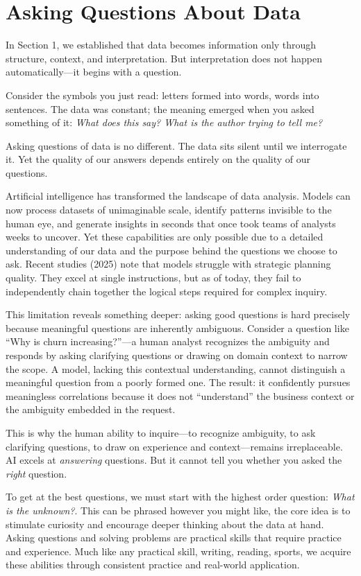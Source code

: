 \section{Asking Questions About Data}

In Section 1, we established that data becomes information only through structure, context, and interpretation. 
But interpretation does not happen automatically---it begins with a question.

Consider the symbols you just read: letters formed into words, words into sentences. 
The data was constant; the meaning emerged when you asked something of it: 
\textit{What does this say? What is the author trying to tell me?}

Asking questions of data is no different. The data sits silent until we interrogate it. 
Yet the quality of our answers depends entirely on the quality of our questions.

Artificial intelligence has transformed the landscape of data analysis. 
Models can now process datasets of unimaginable scale, identify patterns invisible to the human eye, 
and generate insights in seconds that once took teams of analysts weeks to uncover. 
Yet these capabilities are only possible due to a detailed understanding of our data and the purpose behind the questions we choose to ask.
Recent studies (2025) note that models struggle with strategic planning quality. 
They excel at single instructions, but as of today, they fail to independently chain together the logical steps required for complex inquiry. 

This limitation reveals something deeper: asking good questions is hard precisely because meaningful questions are inherently ambiguous. 
Consider a question like ``Why is churn increasing?''---a human analyst recognizes the ambiguity and responds by asking clarifying questions or drawing on domain context to narrow the scope. 
A model, lacking this contextual understanding, cannot distinguish a meaningful question from a poorly formed one. 
The result: it confidently pursues meaningless correlations because it does not ``understand'' the business context or the ambiguity embedded in the request.

This is why the human ability to inquire---to recognize ambiguity, to ask clarifying questions, to draw on experience and context---remains irreplaceable. 
AI excels at \textit{answering} questions. But it cannot tell you whether you asked the \textit{right} question.

To get at the best questions, we must start with the highest order question: \textit{What is the unknown?}. 
This can be phrased however you might like, the core idea is to stimulate curiosity and encourage deeper thinking about the data at hand.
Asking questions and solving problems are practical skills that require practice and experience. 
Much like any practical skill, writing, reading, sports, we acquire these abilities through consistent practice and real-world application.

